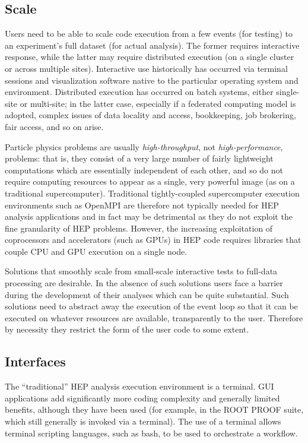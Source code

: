 \subsection{Scale}
Users need to be able to scale code execution from a few events (for testing) to an experiment's full dataset (for actual analysis). The former requires interactive response, while the latter may require distributed execution (on a single cluster or across multiple sites). Interactive use historically has occurred via terminal sessions and visualization software native to the particular operating system and environment. Distributed execution has occurred on batch systems, either single-site or multi-site; in the latter case, especially if a federated computing model is adopted, complex issues of data locality and access, bookkeeping, job brokering, fair access, and so on arise.

Particle physics problems are usually \textit{high-throughput}, not \textit{high-performance}, problems: that is, they consist of a very large number of fairly lightweight computations which are essentially independent of each other, and so do not require computing resources to appear as a single, very powerful image (as on a traditional supercomputer). Traditional tightly-coupled supercomputer execution environments such as OpenMPI are therefore not typically needed for HEP analysis applications and in fact may be detrimental as they do not exploit the fine granularity of HEP problems. However, the increasing exploitation of coprocessors and accelerators (such as GPUs) in HEP code requires libraries that couple CPU and GPU execution on a single node.

Solutions that smoothly scale from small-scale interactive tests to full-data processing are desirable. In the absence of such solutions users face a barrier during the development of their analyses which can be quite substantial. Such solutions need to abstract away the execution of the event loop so that it can be executed on whatever resources are available, transparently to the user. Therefore by necessity they restrict the form of the user code to some extent. 


\subsection{Interfaces}

The ``traditional'' HEP analysis execution environment is a terminal. GUI applications add significantly more coding complexity and generally limited benefits, although they have been used (for example, in the ROOT PROOF suite, which still generally is invoked via a terminal). The use of a terminal allows terminal scripting languages, such as bash, to be used to orchestrate a workflow.

